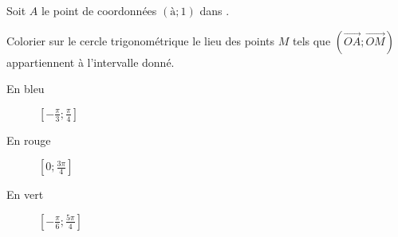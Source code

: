 
Soit $A$ le point de coordonnées $(à;1)$ dans \Oij.

Colorier sur le cercle trigonométrique le lieu des points $M$ tels que $\left( \overrightarrow{OA};\overrightarrow{OM} \right)$ appartiennent à l'intervalle donné.

\begin{description}
\item[En bleu] $\left[ -\frac{\pi}{3};\frac{\pi}{4}\right]$
\item[En rouge] $\left[ 0;\frac{3\pi}{4}\right]$
\item[En vert] $\left[ -\frac{\pi}{6};\frac{5\pi}{4}\right]$
\end{description}

